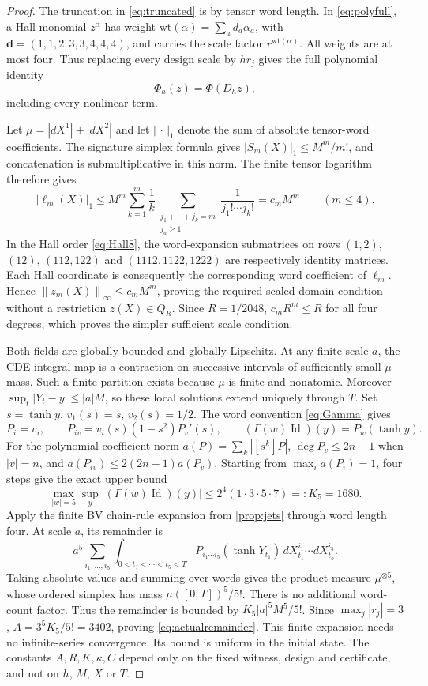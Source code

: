 \documentclass[11pt,a4paper]{article}
\numberwithin{equation}{section}
\theoremstyle{definition}
\theoremstyle{remark}
\DeclareMathOperator{\Id}{Id}
\newcommand{\norm}[1]{\left\lVert #1\right\rVert}
\begin{document}
\begin{proof}
The truncation in \eqref{eq:truncated} is by tensor word length.
In \eqref{eq:polyfull}, a Hall monomial $z^\alpha$ has weight
$\mathrm{wt}(\alpha)=\sum_a d_a\alpha_a$, with
$\mathbf d=(1,1,2,3,3,4,4,4)$, and carries the scale factor
$r^{\mathrm{wt}(\alpha)}$. All weights are at most four. Thus replacing
every design scale by $hr_j$ gives the full polynomial identity
\begin{equation}\label{eq:fullpolyscaling}
 \Phi_h(z)=\Phi(D_hz),
\end{equation}
including every nonlinear term.

Let $\mu=|dX^1|+|dX^2|$ and let $|\,\cdot\,|_1$ denote the sum of
absolute tensor-word coefficients. The signature simplex formula gives
$|S_m(X)|_1\leq M^m/m!$, and concatenation is submultiplicative in this
norm. The finite tensor logarithm therefore gives
\[
 |\ell_m(X)|_1\leq
 M^m\sum_{k=1}^m\frac1k
 \sum_{\substack{j_1+\cdots+j_k=m\\j_a\geq1}}
 \frac1{j_1!\cdots j_k!}=c_mM^m\qquad(m\leq4).
\]
In the Hall order \eqref{eq:Hall8}, the word-expansion submatrices on
rows $(1,2)$, $(12)$, $(112,122)$ and $(1112,1122,1222)$ are respectively
identity matrices. Each Hall coordinate is consequently the corresponding
word coefficient of $\ell_m$. Hence
$\norm{z_m(X)}_\infty\leq c_mM^m$, proving the required scaled domain
condition without a restriction $z(X)\in Q_R$. Since $R=1/2048$,
$c_mR^m\leq R$ for all four degrees, which proves the simpler sufficient
scale condition.

Both fields are globally bounded and globally Lipschitz. At any finite
scale $a$, the CDE integral map is a contraction on successive intervals
of sufficiently small $\mu$-mass. Such a finite partition exists because
$\mu$ is finite and nonatomic. Moreover
$\sup_t|Y_t-y|\leq |a|M$, so these local solutions extend uniquely through
$T$. Set $s=\tanh y$, $v_1(s)=s$, $v_2(s)=1/2$. The word convention
\eqref{eq:Gamma} gives
\[
 P_i=v_i,\qquad P_{iv}=v_i(s)(1-s^2)P_v'(s),\qquad
 (\Gamma(w)\Id)(y)=P_w(\tanh y).
\]
For the polynomial coefficient norm $a(P)=\sum_k|[s^k]P|$,
$\deg P_v\leq2n-1$ when $|v|=n$, and
$a(P_{iv})\leq2(2n-1)a(P_v)$. Starting from
$\max_i a(P_i)=1$, four steps give the exact upper bound
\[
 \max_{|w|=5}\sup_y|(\Gamma(w)\Id)(y)|
 \leq 2^4(1\cdot3\cdot5\cdot7)=:K_5=1680.
\]
Apply the finite BV chain-rule expansion from \cref{prop:jets} through
word length four. At scale $a$, its remainder is
\[
 a^5\sum_{i_1,\ldots,i_5}
 \int_{0<t_1<\cdots<t_5<T}
 P_{i_1\cdots i_5}(\tanh Y_{t_1})
 \,dX^{i_1}_{t_1}\cdots dX^{i_5}_{t_5}.
\]
Taking absolute values and summing over words gives the product measure
$\mu^{\otimes5}$, whose ordered simplex has mass $\mu([0,T])^5/5!$.
There is no additional word-count factor. Thus the remainder is bounded
by $K_5|a|^5M^5/5!$. Since $\max_j|r_j|=3$,
$A=3^5K_5/5!=3402$, proving \eqref{eq:actualremainder}.
This finite expansion needs no infinite-series convergence. Its bound is
uniform in the initial state. The constants $A,R,K,\kappa,C$ depend only on
the fixed witness, design and certificate, and not on $h$, $M$, $X$ or $T$.


\end{proof}
\end{document}
